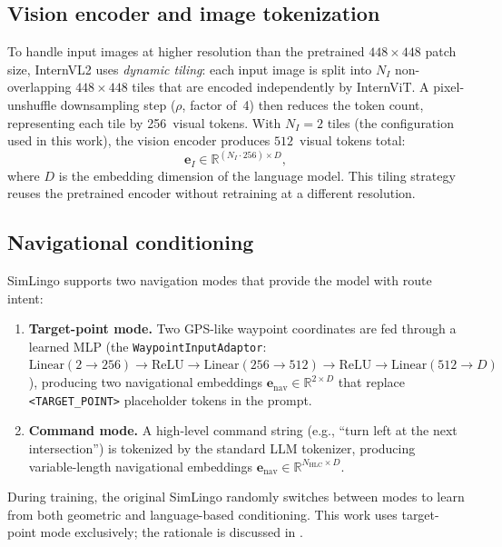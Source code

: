 \subsection{Vision encoder and image tokenization}
\label{sec:vision-encoder}
To handle input images at higher resolution than the pretrained $448\times448$ patch size, InternVL2 uses \emph{dynamic tiling}: each input image is split into $N_I$ non-overlapping $448\times448$ tiles that are encoded independently by InternViT. A pixel-unshuffle downsampling step ($\rho$, factor of~4) then reduces the token count, representing each tile by 256~visual tokens. With $N_I{=}2$ tiles (the configuration used in this work), the vision encoder produces $512$~visual tokens total:
\begin{equation}
  \mathbf{e}_I \in \mathbb{R}^{(N_I \cdot 256)\times D},
\end{equation}
where $D$ is the embedding dimension of the language model. This tiling strategy reuses the pretrained encoder without retraining at a different resolution.

\subsection{Navigational conditioning}
\label{sec:nav-conditioning}
SimLingo supports two navigation modes that provide the model with route intent:
\begin{enumerate}[leftmargin=*,itemsep=0.25em]
  \item \textbf{Target-point mode.} Two GPS-like waypoint coordinates are fed through a learned MLP (the \texttt{WaypointInputAdaptor}: $\text{Linear}(2{\to}256) \to \text{ReLU} \to \text{Linear}(256{\to}512) \to \text{ReLU} \to \text{Linear}(512{\to}D)$), producing two navigational embeddings $\mathbf{e}_{\text{nav}} \in \mathbb{R}^{2\times D}$ that replace \texttt{<TARGET\_POINT>} placeholder tokens in the prompt.
  \item \textbf{Command mode.} A high-level command string (e.g., ``turn left at the next intersection'') is tokenized by the standard LLM tokenizer, producing variable-length navigational embeddings $\mathbf{e}_{\text{nav}} \in \mathbb{R}^{N_{\text{HLC}}\times D}$.
\end{enumerate}
During training, the original SimLingo randomly switches between modes to learn from both geometric and language-based conditioning. This work uses target-point mode exclusively; the rationale is discussed in .

